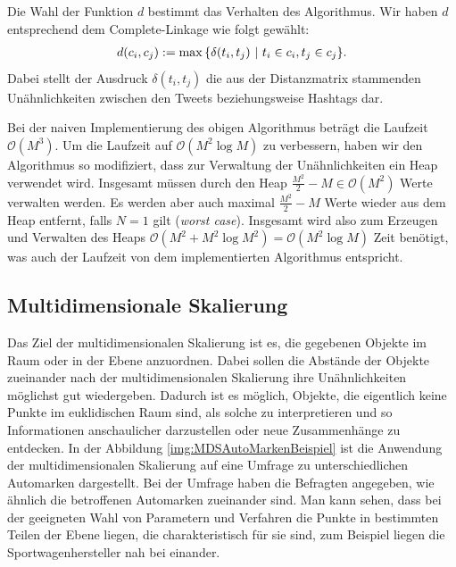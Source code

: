 Die Wahl der Funktion $d$ bestimmt das Verhalten des Algorithmus. Wir haben $d$ entsprechend 
dem Complete-Linkage wie folgt gewählt:
\begin{align}
 d(c_i,c_j) := \max{\left\lbrace \delta(t_i,t_j)\ |\ t_i\in c_i, t_j\in c_j \right\rbrace}. \notag
\end{align}
Dabei stellt der Ausdruck $\delta(t_i,t_j)$ die aus der Distanzmatrix stammenden Unähnlichkeiten 
zwi\-schen den Tweets beziehungsweise Hashtags dar.

Bei der naiven Implementierung des obigen Algorithmus beträgt die Laufzeit $\mathcal{O}(M^3)$. Um die Laufzeit auf
$\mathcal{O}(M^2 \log M)$ zu verbessern, haben wir den Algorithmus so mo\-di\-fi\-ziert, dass zur Verwaltung der
Unähnlichkeiten ein Heap verwendet wird. Insgesamt müssen durch den Heap $\frac{M^2}{2}-M \in \mathcal{O}(M^2)$ Werte
verwalten werden. Es werden aber auch maximal $\frac{M^2}{2}-M$ Werte wieder aus dem Heap entfernt, falls $N = 1$ gilt (\textit{worst case}). Insgesamt wird
also zum Erzeugen und Verwalten des Heaps $\mathcal{O}(M^2 + M^2 \log M^2) = \mathcal{O}(M^2 \log M)$ Zeit
benötigt, was auch der Laufzeit von dem implementierten Algorithmus entspricht.

\subsection{Multidimensionale Skalierung} \label{subsec:MDS}
Das Ziel der multidimensionalen Skalierung ist es, die gegebenen Objekte im Raum oder in der Ebene anzuordnen. 
Dabei sollen die Abstände der Objekte zueinander nach der multidimensionalen Skalierung ihre
Unähnlichkeiten möglichst gut wiedergeben. Dadurch ist es möglich, Objekte, die eigentlich keine Punkte 
im euklidischen Raum sind, als solche zu interpretieren und so Informationen anschaulicher darzustellen oder
neue Zusammenhänge zu entdecken. In der Abbildung \ref{img:MDSAutoMarkenBeispiel} ist die Anwendung
der multidimensionalen Skalierung auf eine Umfrage zu unterschiedlichen Automarken dargestellt. 
Bei der Umfrage haben die Befragten angegeben, wie ähnlich die betroffenen Automarken zueinander sind. Man kann
 sehen, dass bei der geeigneten Wahl von Parametern und Verfahren die Punkte in bestimmten Teilen der Ebene
liegen, die charakteristisch für sie sind, zum Beispiel liegen die Sportwagenhersteller nah bei einander.

